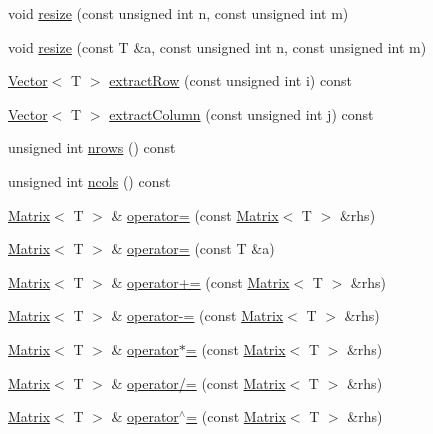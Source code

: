 \begin{DoxyCompactItemize}
\item 
void \mbox{\hyperlink{classMatrix_a8d10454cfe9427269b54a754262004b8}{resize}} (const unsigned int n, const unsigned int m)
\item 
void \mbox{\hyperlink{classMatrix_ae866a1b312aa040b587b40c5f54b6a54}{resize}} (const T \&a, const unsigned int n, const unsigned int m)
\item 
\mbox{\hyperlink{classVector}{Vector}}$<$ T $>$ \mbox{\hyperlink{classMatrix_a7dded77c0f4c424c98858b5f94c13c16}{extract\+Row}} (const unsigned int i) const
\item 
\mbox{\hyperlink{classVector}{Vector}}$<$ T $>$ \mbox{\hyperlink{classMatrix_a4361c4478b01f7df1173e5b64eccd127}{extract\+Column}} (const unsigned int j) const
\item 
unsigned int \mbox{\hyperlink{classMatrix_ad025820349fa69f73f2da395af627741}{nrows}} () const
\item 
unsigned int \mbox{\hyperlink{classMatrix_aa62107f075998f969b39fcb1bef20c44}{ncols}} () const
\item 
\mbox{\hyperlink{classMatrix}{Matrix}}$<$ T $>$ \& \mbox{\hyperlink{classMatrix_a01990eb2552555d37c83272125be68e6}{operator=}} (const \mbox{\hyperlink{classMatrix}{Matrix}}$<$ T $>$ \&rhs)
\item 
\mbox{\hyperlink{classMatrix}{Matrix}}$<$ T $>$ \& \mbox{\hyperlink{classMatrix_a603960a94121d9b35509199de88d1a92}{operator=}} (const T \&a)
\item 
\mbox{\hyperlink{classMatrix}{Matrix}}$<$ T $>$ \& \mbox{\hyperlink{classMatrix_a36fdb87d0aa1b906eda9fa1cf81a1477}{operator+=}} (const \mbox{\hyperlink{classMatrix}{Matrix}}$<$ T $>$ \&rhs)
\item 
\mbox{\hyperlink{classMatrix}{Matrix}}$<$ T $>$ \& \mbox{\hyperlink{classMatrix_a50e2998bc90012d77efc0ff39d089336}{operator-\/=}} (const \mbox{\hyperlink{classMatrix}{Matrix}}$<$ T $>$ \&rhs)
\item 
\mbox{\hyperlink{classMatrix}{Matrix}}$<$ T $>$ \& \mbox{\hyperlink{classMatrix_af6a95588910fa9c53feaae71fe88df81}{operator$\ast$=}} (const \mbox{\hyperlink{classMatrix}{Matrix}}$<$ T $>$ \&rhs)
\item 
\mbox{\hyperlink{classMatrix}{Matrix}}$<$ T $>$ \& \mbox{\hyperlink{classMatrix_aab1b305350c7547ee31f0eeb92fc8c4a}{operator/=}} (const \mbox{\hyperlink{classMatrix}{Matrix}}$<$ T $>$ \&rhs)
\item 
\mbox{\hyperlink{classMatrix}{Matrix}}$<$ T $>$ \& \mbox{\hyperlink{classMatrix_acf14abe2000a4a41dae10db14b5d039c}{operator$^\wedge$=}} (const \mbox{\hyperlink{classMatrix}{Matrix}}$<$ T $>$ \&rhs)

\end{DoxyCompactItemize}
